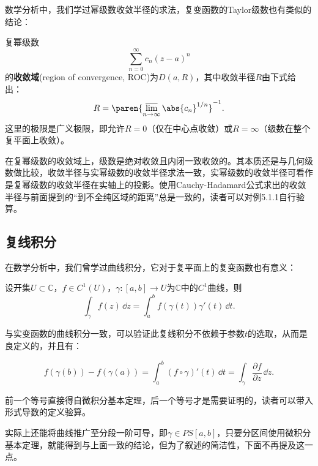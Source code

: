 数学分析中，我们学过幂级数收敛半径的求法，复变函数的Taylor级数也有类似的结论：
\begin{theorem}
    复幂级数
    \begin{equation}
        \sum_{n=0}^{\infty}c_n(z-a)^n
    \end{equation}
    的\textbf{收敛域}(region of convergence, ROC)为$D(a,R)$，其中收敛半径$R$由下式给出：
    \begin{equation}
        R=\paren{\varlimsup_{n\to\infty}\abs{c_n}^{1/n}}^{-1}.
    \end{equation}
    这里的极限是广义极限，即允许$R=0$（仅在中心点收敛）或$R=\infty$（级数在整个复平面上收敛）。
\end{theorem}
在复幂级数的收敛域上，级数是绝对收敛且内闭一致收敛的。其本质还是与几何级数做比较，收敛半径与实幂级数的收敛半径求法一致，实幂级数的收敛半径可看作是复幂级数的收敛半径在实轴上的投影。使用Cauchy-Hadamard公式求出的收敛半径与前面提到的“到不全纯区域的距离”总是一致的，读者可以对例5.1.1自行验算。

\subsection{复线积分}\label{sub:line_integral}
在数学分析中，我们曾学过曲线积分，它对于复平面上的复变函数也有意义：
\begin{definition}[复线积分]
    设开集$U\subset\mathbb{C}$，$f\in C^1(U)$，$\gamma:[a,b]\to U$为$\mathbb{C}$中的$C^1$曲线，则
    \begin{equation}
        \int_{\gamma}f(z)\,\dd z=\int_a^b f(\gamma(t))\gamma'(t)\,\dd t.
    \end{equation}
\end{definition}

与实变函数的曲线积分一致，可以验证此复线积分不依赖于参数$t$的选取，从而是良定义的，并且有：
\begin{proposition}
    \begin{equation}
        f(\gamma(b))-f(\gamma(a))=\int_{a}^{b}(f\circ\gamma)'(t)\,\dd t=\int_{\gamma}\frac{\partial f}{\partial z}\,\dd z.
    \end{equation}
\end{proposition}
\begin{remark}
    前一个等号直接得自微积分基本定理，后一个等号才是需要证明的，读者可以带入形式导数的定义验算。
\end{remark}
实际上还能将曲线推广至分段一阶可导，即$\gamma\in PS[a,b]$，只要分区间使用微积分基本定理，就能得到与上面一致的结论，但为了叙述的简洁性，下面不再提及这一点。

